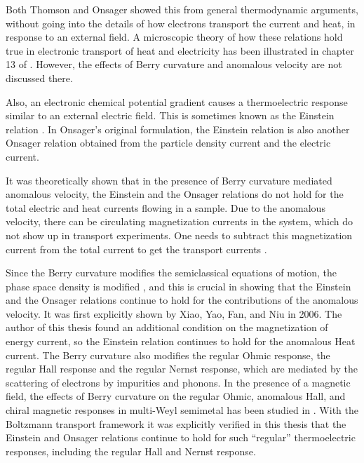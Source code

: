 \documentclass{report}
\begin{document}
Both Thomson and Onsager showed this from general thermodynamic arguments, without going into the details of how electrons transport the current and heat, in response to an external field. A microscopic theory of how these relations hold true in electronic transport of heat and electricity has been illustrated in chapter 13 of \cite{book:AshcroftMermin76}. However, the effects of Berry curvature and anomalous velocity are not discussed there.

Also, an electronic chemical potential gradient causes a thermoelectric response similar to an external electric field. This is sometimes known as the Einstein relation \cite{XiaoElecPropertiesReview2010}. In Onsager's original formulation, the Einstein relation is also another Onsager relation obtained from the particle density current and the electric current.

It was theoretically shown that in the presence of Berry curvature mediated anomalous velocity, the Einstein and the Onsager relations do not hold for the total electric and heat currents flowing in a sample. Due to the anomalous velocity, there can be circulating magnetization currents in the system, which do not show up in transport experiments. One needs to subtract this magnetization current from the total current to get the transport currents \cite{CooperHalperin1997, Ussishkin_2002}.

Since the Berry curvature modifies the semiclassical equations of motion, the phase space density is modified \cite{BerryCorrectionPhaseSpaceNiu2005}, and this is crucial in showing that the Einstein and the Onsager relations continue to hold for the contributions of the anomalous velocity. It was first explicitly shown \cite{PhysRevLett.97.026603} by Xiao, Yao, Fan, and Niu in 2006. The author of this thesis found an additional condition on the magnetization of energy current, so the Einstein relation continues to hold for the anomalous Heat current.
The Berry curvature also modifies the regular Ohmic response, the regular Hall response and the regular Nernst response, which are mediated by the scattering of electrons by impurities and phonons. In the presence of a magnetic field, the effects of Berry curvature on the regular Ohmic, anomalous Hall, and chiral magnetic responses in multi-Weyl semimetal has been studied in \cite{WeylMagnetotransport}. With the Boltzmann transport framework it was explicitly verified in this thesis that the Einstein and Onsager relations continue to hold for such ``regular'' thermoelectric responses, including the regular Hall and Nernst response.
\end{document}
